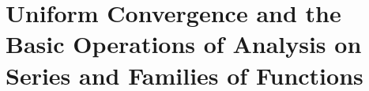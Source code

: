 \chapter{Uniform Convergence and the Basic Operations of Analysis on Series and Families of Functions}
